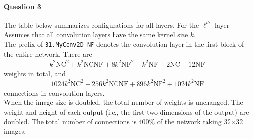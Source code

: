 \documentclass[12pt]{article}
\newcommand{\m}[0]{$\times$}
\begin{document}
	\paragraph{Question 3} The table below summarizes configurations for all layers. For the $\ell^{th}$ layer. \\
	Assumes that all convolution layers have the same kernel size $k$.\\
	The prefix of \texttt{B1.MyConv2D-NF} denotes the convolution layer in the first block of the entire network. 
	There are
	\begin{align}
		k^2 \text{NC}^2+k^2 \text{NC} \text{NF}+8 k^2 \text{NF}^2+k^2 \text{NF}+2 \text{NC}+12 \text{NF}
	\end{align}
	weights in total, and 
	\begin{align}
		1024 k^2 \text{NC}^2+256 k^2 \text{NC} \text{NF}+896 k^2 \text{NF}^2+1024 k^2 \text{NF}
	\end{align}
	connections in convolution layers.\\
	When the image size is doubled, the total number of weights is unchanged. The weight and height of each output (i.e., the first two dimensions of the output) are doubled. The total number of connections is 400\% of the network taking 32\m 32 images.
\end{document}
